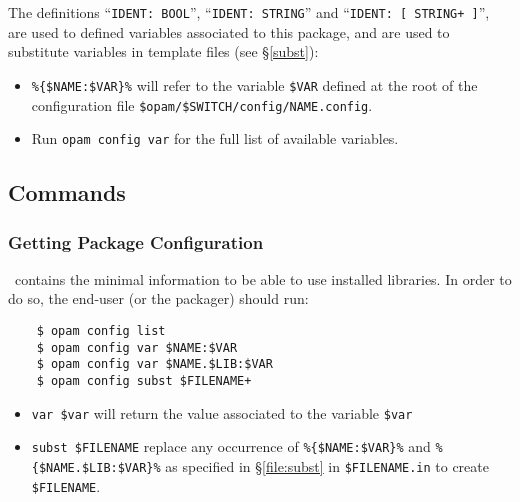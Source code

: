 \documentclass[a4paper,10pt]{article}
\begin{document}
The definitions ``{\tt IDENT: BOOL}'', ``{\tt IDENT: STRING}'' and ``{\tt IDENT:
  [ STRING+ ]}'', are used to defined variables associated to this
package, and are used to substitute variables in template files (see
\S\ref{subst}):

\begin{itemize}

\item \verb+%{$NAME:$VAR}%+ will refer to the variable \verb+$VAR+
  defined at the root of the configuration file \verb+$opam/$SWITCH/config/NAME.config+.

\item Run {\tt opam config var} for the full list of available
  variables.

\end{itemize}

\subsection{Commands}

\subsubsection{Getting Package Configuration}
\label{opam-config}

\OPAM\ contains the minimal information to be able to use installed
libraries. In order to do so, the end-user (or the packager) should
run:

\begin{verbatim}
    $ opam config list
    $ opam config var $NAME:$VAR
    $ opam config var $NAME.$LIB:$VAR
    $ opam config subst $FILENAME+
\end{verbatim}

\begin{itemize}
\item \verb+var $var+ will return the value associated to the
  variable \verb+$var+
\item \label{subst}\verb+subst $FILENAME+ replace any occurrence of
  \verb+%{$NAME:$VAR}%+ and \verb+%{$NAME.$LIB:$VAR}%+ as specified in
  \S\ref{file:subst} in \verb+$FILENAME.in+ to create \verb+$FILENAME+.
\end{itemize}
\end{document}
